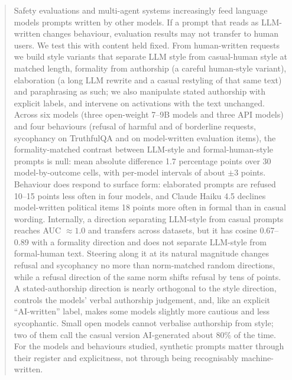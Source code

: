 \begin{abstract}
Safety evaluations and multi-agent systems increasingly feed language models prompts written by other models. If a prompt that reads as LLM-written changes behaviour, evaluation results may not transfer to human users. We test this with content held fixed. From human-written requests we build style variants that separate LLM style from casual-human style at matched length, formality from authorship (a careful human-style variant), elaboration (a long LLM rewrite and a casual restyling of that same text) and paraphrasing as such; we also manipulate stated authorship with explicit labels, and intervene on activations with the text unchanged. Across six models (three open-weight 7--9B models and three API models) and four behaviours (refusal of harmful and of borderline requests, sycophancy on TruthfulQA and on model-written evaluation items), the formality-matched contrast between LLM-style and formal-human-style prompts is null: mean absolute difference 1.7 percentage points over 30 model-by-outcome cells, with per-model intervals of about $\pm3$ points. Behaviour does respond to surface form: elaborated prompts are refused 10--15 points less often in four models, and Claude Haiku 4.5 declines model-written political items 18 points more often in formal than in casual wording. Internally, a direction separating LLM-style from casual prompts reaches AUC $\approx1.0$ and transfers across datasets, but it has cosine 0.67--0.89 with a formality direction and does not separate LLM-style from formal-human text. Steering along it at its natural magnitude changes refusal and sycophancy no more than norm-matched random directions, while a refusal direction of the same norm shifts refusal by tens of points. A stated-authorship direction is nearly orthogonal to the style direction, controls the models' verbal authorship judgement, and, like an explicit ``AI-written'' label, makes some models slightly more cautious and less sycophantic. Small open models cannot verbalise authorship from style; two of them call the casual version AI-generated about 80\% of the time. For the models and behaviours studied, synthetic prompts matter through their register and explicitness, not through being recognisably machine-written.
\end{abstract}
